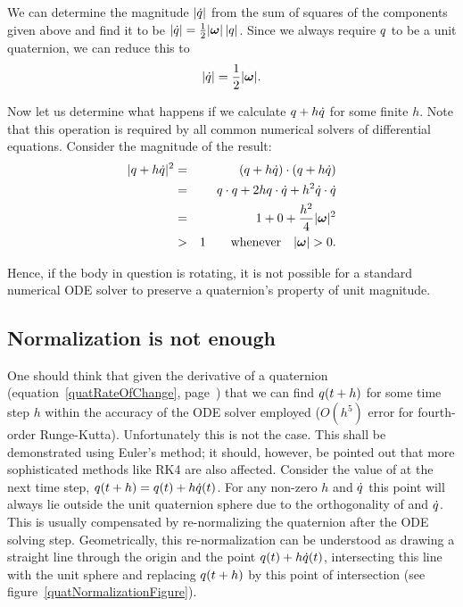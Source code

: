 We can determine the magnitude $|\dot{q}|$ from the sum of squares of the
components given above and find it to be
$\norm{\dot{\q{q}}} = \frac{1}{2}\norm{\ve{\omega}}\,\norm{\q{q}}$. Since we always
require $q$ to be a unit quaternion, we can reduce this to
\begin{equation}
\label{quatRateOfChangeMagnitude}
\norm{\dot{\q{q}}} = \frac{1}{2}\norm{\ve{\omega}}.
\end{equation}

Now let us determine what happens if we calculate $q + h\dot{q}$ for some finite $h$.
Note that this operation is required by all common numerical solvers of differential equations.
Consider the magnitude of the result:
\begin{eqnarray*}
\norm{\q{q} + h\dot{\q{q}}}^2 & = & (\q{q} + h\dot{\q{q}})\cdot(\q{q} + h\dot{\q{q}}) \\
&=& \q{q}\cdot\q{q} + 2h\q{q}\cdot\dot{\q{q}} + h^2\dot{\q{q}}\cdot\dot{\q{q}} \\
&=& 1 + 0 + \frac{h^2}{4}\norm{\ve{\omega}}^2 \\
&>& 1 \quad\quad\mbox{whenever}\quad \norm{\ve{\omega}} > 0.
\end{eqnarray*}

Hence, if the body in question is rotating, it is not possible for a standard numerical ODE solver
to preserve a quaternion's property of unit magnitude.


\subsection{Normalization is not enough\label{quatNormalization}}

One should think that given the derivative of a quaternion  (equation~\ref{quatRateOfChange},
page~\pageref{quatRateOfChange}) that we can find $q(t + h)$ for some time step $h$ within
the accuracy of the ODE solver employed ($O(h^5)$ error for fourth-order Runge-Kutta).
Unfortunately this is not the case. This shall be demonstrated using Euler's method; it should,
however, be pointed out that more sophisticated methods like RK4 are also affected. Consider the
value of  at the next time step, $q(t + h) = q(t) + h \dot{q}(t)$. For any
non-zero $h$ and $\dot{q}$ this point will always lie outside the unit quaternion sphere due
to the orthogonality of  and $\dot{q}$. This is usually compensated by re-normalizing
the quaternion after the ODE solving step. Geometrically, this re-normalization can be understood
as drawing a straight line through the origin and the point $q(t) + h \dot{q}(t)$,
intersecting this line with the unit sphere and replacing $q(t + h)$ by this point of
intersection (see figure~\ref{quatNormalizationFigure}).

